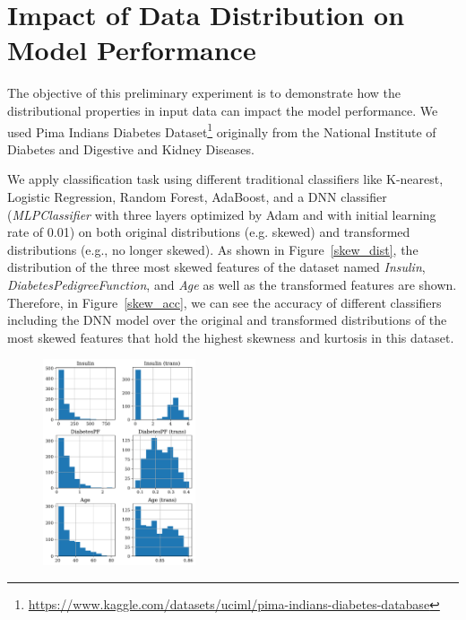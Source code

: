{\color{red}
\section{Impact of Data Distribution on Model Performance}
\label{impact_app}
The objective of this preliminary experiment is to demonstrate how the distributional properties in input data can impact the model performance. We used Pima Indians Diabetes Dataset\footnote{\url{https://www.kaggle.com/datasets/uciml/pima-indians-diabetes-database}} originally from the National Institute of Diabetes and Digestive and Kidney Diseases. 

We apply classification task using different traditional classifiers like K-nearest, Logistic Regression, Random Forest, AdaBoost, and a DNN classifier (\emph{MLPClassifier} with three layers optimized by Adam and with initial learning rate of 0.01) on both original distributions (e.g. skewed) and transformed distributions (e.g., no longer skewed). 
As shown in Figure~\ref{skew_dist}, the distribution of the three most skewed features of the dataset named \emph{Insulin}, \emph{DiabetesPedigreeFunction}, and \emph{Age} as well as the transformed features are shown. Therefore, in Figure~\ref{skew_acc}, we can see the accuracy of different classifiers including the DNN model over the original and transformed distributions of the most skewed features that hold the highest skewness and kurtosis in this dataset.
\begin{figure}[!ht]  %
	\centering
	\includegraphics[width=0.4\textwidth]{figures/dist.pdf}
	\vspace{-0.3cm}

\end{figure}}
